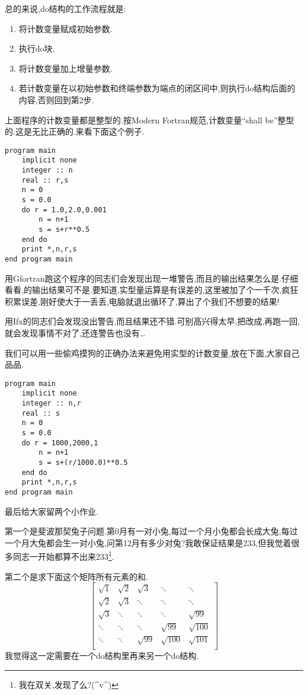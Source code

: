 总的来说,do结构的工作流程就是:
\begin{enumerate}
    \item 将计数变量赋成初始参数.
    \item 执行do块.
    \item 将计数变量加上增量参数.
    \item 若计数变量在以初始参数和终端参数为端点的闭区间中,则执行do结构后面的内容,否则回到第2步.
\end{enumerate}

上面程序的计数变量都是整型的.按Modern Fortran规范,计数变量``shall be''整型的.这是无比正确的.来看下面这个例子.
\begin{lstlisting}
program main
    implicit none
    integer :: n
    real :: r,s
    n = 0
    s = 0.0
    do r = 1.0,2.0,0.001
        n = n+1
        s = s+r**0.5
    end do
    print *,n,r,s
end program main
\end{lstlisting}

用Gfortran跑这个程序的同志们会发现出现一堆警告,而且的输出结果怎么是.仔细看看,的输出结果可不是.要知道,实型量运算是有误差的,这里被加了个一千次,疯狂积累误差,刚好使大于一丢丢,电脑就退出循环了,算出了个我们不想要的结果!

用Ifx的同志们会发现没出警告,而且结果还不错.可别高兴得太早,把改成,再跑一回,就会发现事情不对了,还连警告也没有\dots

我们可以用一些偷鸡摸狗的正确办法来避免用实型的计数变量,放在下面,大家自己品品.
\begin{lstlisting}
program main
    implicit none
    integer :: n,r
    real :: s
    n = 0
    s = 0.0
    do r = 1000,2000,1
        n = n+1
        s = s+(r/1000.0)**0.5
    end do
    print *,n,r,s
end program main
\end{lstlisting}

最后给大家留两个小作业.

第一个是斐波那契兔子问题.第0月有一对小兔,每过一个月小兔都会长成大兔,每过一个月大兔都会生一对小兔,问第12月有多少对兔?我敢保证结果是233,但我觉着很多同志一开始都算不出来233\footnote{
    我在双关,发现了么?(\^{}v\^{})
}.

第二个是求下面这个矩阵所有元素的和.\label{hw_2}
\begin{equation*}
    \begin{bmatrix}
        \sqrt{1}     &\sqrt{2}     &\sqrt{3}     &\ddots&\ddots\\
        \sqrt{2}     &\sqrt{3}     &\ddots&\ddots&\ddots\\
        \sqrt{3}     &\ddots&\ddots&\ddots&\sqrt{99}    \\
        \ddots&\ddots&\ddots&\sqrt{99}    &\sqrt{100}    \\
        \ddots&\ddots&\sqrt{99}    &\sqrt{100}   &\sqrt{101}   \\
    \end{bmatrix}
\end{equation*}
我觉得这一定需要在一个do结构里再来另一个do结构.


